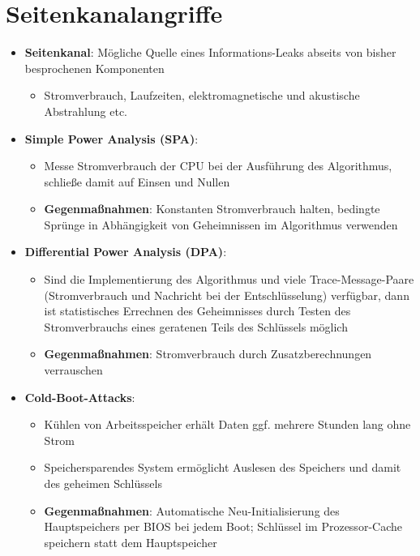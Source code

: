 \section{Seitenkanalangriffe}%
\label{skangr:sec:seitenkanalangriffe}

\begin{itemize}
	\item \textbf{Seitenkanal}: Mögliche Quelle eines Informations-Leaks abseits von bisher besprochenen Komponenten
	\begin{itemize}
		\item Stromverbrauch, Laufzeiten, elektromagnetische und akustische Abstrahlung etc.
	\end{itemize}
	\item \textbf{Simple Power Analysis (SPA)}:
	\begin{itemize}
		\item Messe Stromverbrauch der CPU bei der Ausführung des Algorithmus, schließe damit auf Einsen und Nullen
		\item \textbf{Gegenmaßnahmen}: Konstanten Stromverbrauch halten, bedingte Sprünge in Abhängigkeit von Geheimnissen im Algorithmus verwenden
	\end{itemize}
	\item \textbf{Differential Power Analysis (DPA)}:
	\begin{itemize}
		\item Sind die Implementierung des Algorithmus und viele Trace-Message-Paare (Stromverbrauch und Nachricht bei der Entschlüsselung) verfügbar, dann ist statistisches Errechnen des Geheimnisses durch Testen des Stromverbrauchs eines geratenen Teils des Schlüssels möglich
		\item \textbf{Gegenmaßnahmen}: Stromverbrauch durch Zusatzberechnungen verrauschen
	\end{itemize}
	\item \textbf{Cold-Boot-Attacks}:
	\begin{itemize}
		\item Kühlen von Arbeitsspeicher erhält Daten ggf. mehrere Stunden lang ohne Strom
		\item Speichersparendes System ermöglicht Auslesen des Speichers und damit des geheimen Schlüssels
		\item \textbf{Gegenmaßnahmen}: Automatische Neu-Initialisierung des Hauptspeichers per BIOS bei jedem Boot; Schlüssel im Prozessor-Cache speichern statt dem Hauptspeicher
	\end{itemize}
\end{itemize}